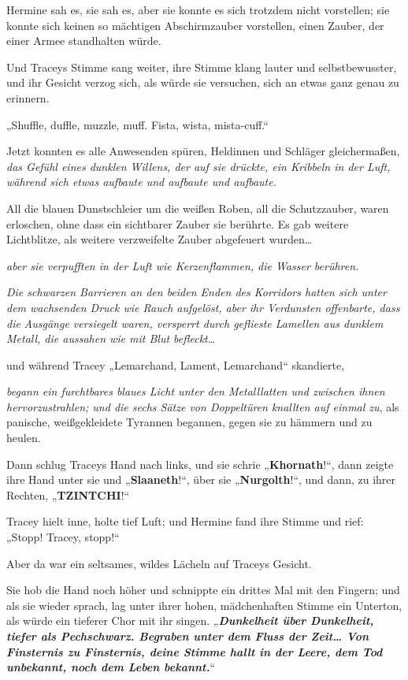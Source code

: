{Hermine sah es, sie sah es, aber sie konnte es sich trotzdem nicht vorstellen; sie konnte sich keinen so mächtigen Abschirmzauber vorstellen, einen Zauber, der einer Armee standhalten würde.

Und Traceys Stimme sang weiter, ihre Stimme klang lauter und selbstbewusster, und ihr Gesicht verzog sich, als würde sie versuchen, sich an etwas ganz genau zu erinnern.

„Shuffle, duffle, muzzle, muff. Fista, wista, mista-cuff.“

Jetzt konnten es alle Anwesenden spüren, Heldinnen und Schläger gleichermaßen, \emph{das Gefühl eines dunklen Willens, der auf sie drückte, ein Kribbeln in der Luft, während sich etwas aufbaute und aufbaute und aufbaute.}

All die blauen Dunstschleier um die weißen Roben, all die Schutzzauber, waren erloschen, ohne dass ein sichtbarer Zauber sie berührte. Es gab weitere Lichtblitze, als weitere verzweifelte Zauber abgefeuert wurden…

\emph{aber sie verpufften in der Luft wie Kerzenflammen, die Wasser berühren.}

\emph{Die schwarzen Barrieren an den beiden Enden des Korridors hatten sich unter dem wachsenden Druck wie Rauch aufgelöst, aber ihr Verdunsten offenbarte, dass die} \emph{Ausgänge versiegelt waren, versperrt durch geflieste Lamellen aus dunklem Metall, die aussahen wie mit Blut befleckt…}

und während Tracey „Lemarchand, Lament, Lemarchand“ skandierte,

\emph{begann ein furchtbares blaues Licht unter den Metalllatten und zwischen ihnen hervorzustrahlen; und die sechs Sätze von Doppeltüren knallten auf einmal zu}, als panische, weißgekleidete Tyrannen begannen, gegen sie zu hämmern und zu heulen.

Dann schlug Traceys Hand nach links, und sie schrie „\textbf{Khornath}!“, dann zeigte ihre Hand unter sie und „\textbf{Slaaneth}!“, über sie „\textbf{Nurgolth}!“, und dann, zu ihrer Rechten, „\textbf{TZINTCHI}!“

Tracey hielt inne, holte tief Luft; und Hermine fand ihre Stimme und rief: „Stopp! Tracey, stopp!“

Aber da war ein seltsames, wildes Lächeln auf Traceys Gesicht.

Sie hob die Hand noch höher und schnippte ein drittes Mal mit den Fingern; und als sie wieder sprach, lag unter ihrer hohen, mädchenhaften Stimme ein Unterton, als würde ein tieferer Chor mit ihr singen. „\textbf{\emph{Dunkelheit über Dunkelheit, tiefer als Pechschwarz. Begraben unter dem Fluss der Zeit… Von Finsternis zu Finsternis, deine Stimme hallt in der Leere, dem Tod unbekannt, noch dem Leben bekannt.}}“

}
